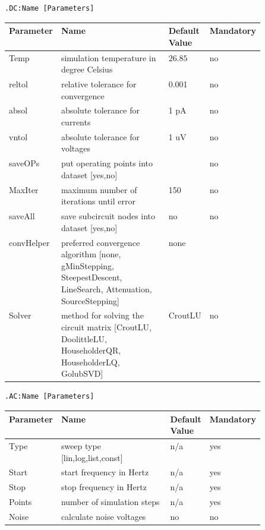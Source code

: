 
\label{chap:simulation}




\begin{verbatim}
.DC:Name [Parameters]
\end{verbatim}


\begin{tabular}{|l|p{0.5\linewidth}|l|l|}
\hline
Parameter & Name & Default Value & Mandatory \\
\hline
Temp & simulation temperature in degree Celsius& $26.85$ & no \\
reltol & relative tolerance for convergence & 0.001 & no \\
absol & absolute tolerance for currents & 1 pA & no \\
vntol & absolute tolerance for voltages & 1 uV & no \\
saveOPs & put operating points into dataset [yes,no]& & no \\
MaxIter & maximum number of iterations until error & 150 & no \\
saveAll & save subcircuit nodes into dataset [yes,no]& no & no\\
convHelper & preferred convergence algorithm [none, gMinStepping, SteepestDescent, LineSearch, Attenuation, SourceStepping]& none & \\
Solver & method for solving the circuit matrix [CroutLU, DoolittleLU, HouseholderQR, HouseholderLQ, GolubSVD] & CroutLU & no \\
\hline
\end{tabular}




\begin{verbatim}
.AC:Name [Parameters]
\end{verbatim}


\begin{tabular}{|l|p{0.5\linewidth}|l|l|}
\hline
Parameter & Name & Default Value & Mandatory \\
\hline
Type & sweep type [lin,log,list,const] & n/a & yes \\
Start & start frequency in Hertz & n/a & yes \\
Stop & stop frequency in Hertz & n/a & yes \\
Points & number of simulation steps & n/a & yes \\
Noise & calculate noise voltages & no & no \\
\hline
\end{tabular}



